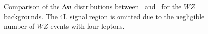 \begin{itemize}
\begin{figure}[h]
{			
		}
		\caption{Comparison of the $\Delta m$ distributions between \powheg~and \sherpa~for the $WZ$ backgrounds. The 4L signal region is omitted due to the negligible number of $WZ$ events with four leptons.}
		\label{fig:systematic-WZ-shape}
	\end{figure}


\end{itemize}
